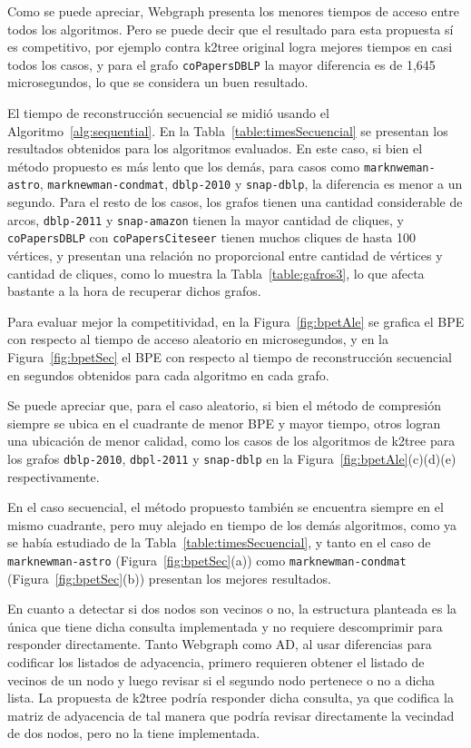 Como se puede apreciar, Webgraph presenta los menores tiempos de acceso entre todos los algoritmos. Pero se puede decir que el resultado para esta propuesta sí es competitivo, por ejemplo contra k2tree original logra mejores tiempos en casi todos los casos, y para el grafo \texttt{coPapersDBLP} la mayor diferencia es de 1,645 microsegundos, lo que se considera un buen resultado.


%

El tiempo de reconstrucción secuencial se midió usando el Algoritmo~\ref{alg:sequential}. En la Tabla~\ref{table:timesSecuencial} se presentan los resultados obtenidos para los algoritmos evaluados. En este caso, si bien el método propuesto es más lento que los demás, para casos como \texttt{marknweman-astro}, \texttt{marknewman-condmat}, \texttt{dblp-2010} y \texttt{snap-dblp}, la diferencia es menor a un segundo. Para el resto de los casos, los grafos tienen una cantidad considerable de arcos, \texttt{dblp-2011} y \texttt{snap-amazon} tienen la mayor cantidad de cliques, y \texttt{coPapersDBLP} con \texttt{coPapersCiteseer} tienen muchos cliques de hasta 100 vértices, y presentan una relación no proporcional entre cantidad de vértices y cantidad de cliques, como lo muestra la Tabla~\ref{table:gafros3}, lo que afecta bastante a la hora de recuperar dichos grafos.

Para evaluar mejor la competitividad, en la Figura~\ref{fig:bpetAle} se grafica el BPE con respecto al tiempo de acceso aleatorio en microsegundos, y en la Figura~\ref{fig:bpetSec} el BPE con respecto al tiempo de reconstrucción secuencial en segundos obtenidos para cada algoritmo en cada grafo. 

Se puede apreciar que, para el caso aleatorio, si bien el método de compresión siempre se ubica en el cuadrante de menor BPE y mayor tiempo, otros logran una ubicación de menor calidad, como los casos de los algoritmos de k2tree para los grafos \texttt{dblp-2010}, \texttt{dbpl-2011} y \texttt{snap-dblp} en la Figura~\ref{fig:bpetAle}(c)(d)(e) respectivamente. 

En el caso secuencial, el método propuesto también se encuentra siempre en el mismo cuadrante, pero muy alejado en tiempo de los demás algoritmos, como ya se había estudiado de la Tabla~\ref{table:timesSecuencial}, y tanto en el caso de \texttt{marknewman-astro} (Figura~\ref{fig:bpetSec}(a)) como \texttt{marknewman-condmat} (Figura~\ref{fig:bpetSec}(b)) presentan los mejores resultados.

 
% 




En cuanto a detectar si dos nodos son vecinos o no, la estructura planteada es la única que tiene dicha consulta implementada y no requiere descomprimir para responder directamente. Tanto Webgraph como AD, al usar diferencias para codificar los listados de adyacencia, primero requieren obtener el listado de vecinos de un nodo y luego revisar si el segundo nodo pertenece o no a dicha lista. La propuesta de k2tree podría responder dicha consulta, ya que codifica la matriz de adyacencia de tal manera que podría revisar directamente la vecindad de dos nodos, pero no la tiene implementada.
